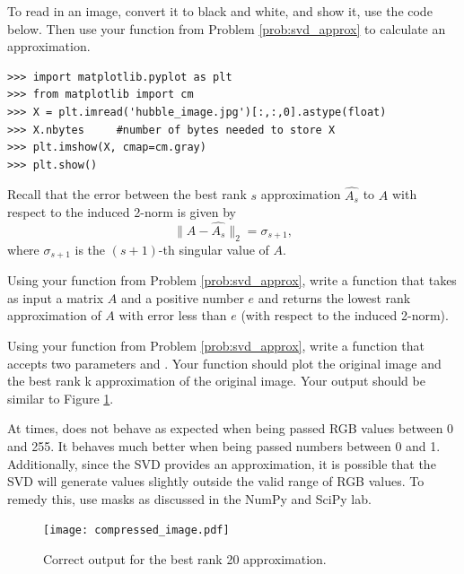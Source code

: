 To read in an image, convert it to black and white, and show it, use the code below.
Then use your function from Problem \ref{prob:svd_approx} to calculate an approximation.
\begin{lstlisting}
>>> import matplotlib.pyplot as plt
>>> from matplotlib import cm
>>> X = plt.imread('hubble_image.jpg')[:,:,0].astype(float)
>>> X.nbytes     #number of bytes needed to store X
>>> plt.imshow(X, cmap=cm.gray)
>>> plt.show()
\end{lstlisting}

Recall that the error between the best rank $s$ approximation $\widehat{A_s}$ to $A$ with respect to the induced 
2-norm is given by
$$
\|A - \widehat{A_s}\|_2 = \sigma_{s+1},
$$
where $\sigma_{s+1}$ is the $(s+1)$-th singular value of $A$. 

\begin{problem}
Using your  function from Problem \ref{prob:svd_approx}, write a function  that takes as input a matrix $A$ and a positive number $e$ and returns
the lowest rank approximation of $A$ with error less than $e$ (with respect to the induced 2-norm).
\end{problem}

\begin{problem}
Using your  function from Problem \ref{prob:svd_approx}, write a function  that accepts two parameters  and . Your function should plot the original image and the best rank k approximation of the original image. Your output should be similar to Figure \ref{fig:compressed_image}.

At times,  does not behave as expected when being passed RGB values between 0 and 255. It behaves much better when being passed numbers between 0 and 1. Additionally, since the SVD provides an approximation, it is possible that the SVD will generate values slightly outside the valid range of RGB values. To remedy this, use masks as discussed in the NumPy and SciPy lab. 

\begin{figure}[H]
\texttt{[image: compressed\_image.pdf]}
\caption{Correct output for the best rank 20 approximation.}
\label{fig:compressed_image}
\end{figure}
\end{problem}
